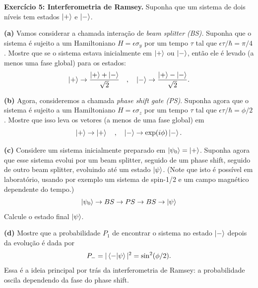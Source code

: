 \documentclass[12pt]{article}
\begin{document}
\textbf{Exercício 5: Interferometria de Ramsey.} Suponha que um sistema de dois níveis tem estados $\ket{+}$ e $\ket{-}$.

\textbf{(a)} Vamos considerar a chamada interação de \textit{beam splitter (BS).} Suponha que o sistema é sujeito a um Hamiltoniano $H = \epsilon \sigma_y$ por um tempo $\tau$ tal que $\epsilon \tau /\hbar = \pi/4$.
Mostre que se o sistema estava inicialmente em $\ket{+}$ ou $\ket{-}$, então ele é levado (a menos uma fase global) para os estados:
\[
\ket{+} \to \frac{\ket{+} + \ket{-}}{\sqrt{2}}
\quad,\quad
\ket{-} \to \frac{\ket{+} - \ket{-}}{\sqrt{2}}.
\]

\textbf{(b)} Agora, consideremos a chamada \textit{phase shift gate (PS)}. Suponha agora que o sistema é sujeito a um Hamiltoniano $H = \epsilon \sigma_z$ por um tempo $\tau$ tal que $\epsilon \tau /\hbar = \phi/2$. Mostre que isso leva os vetores (a menos de uma fase global) em
\[
\ket{+} \to \ket{+}\quad,\quad\ket{-} \to \exp(i\phi)\ket{-}.
\]

\textbf{(c)} Considere um sistema inicialmente preparado em $\ket{\psi_0} = \ket{+}$. Suponha agora que esse sistema evolui por um beam splitter, seguido de um phase shift, seguido de outro beam splitter, evoluindo até um estado $\ket{\psi}$. (Note que isto é possível em laboratório, usando por exemplo um sistema de spin-1/2 e um campo magnético dependente do tempo.)
\[
\ket{\psi_0} \to BS \to PS \to BS \to \ket{\psi}
\]
Calcule o estado final $\ket{\psi}$. 

\textbf{(d)} Mostre que a probabilidade $P_1$ de encontrar o sistema no estado $\ket{-}$ depois da evolução é dada por
\[
P_- = |\bra{-}\ket{\psi}|^2 = \sin^2(\phi/2).
\]
Essa é a ideia principal por trás da interferometria de Ramsey: a probabilidade oscila
dependendo da fase do phase shift.
\end{document}
